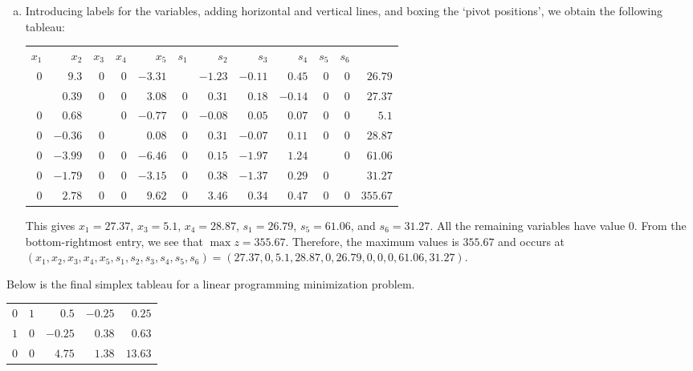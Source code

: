 \documentclass[11pt,letterpaper]{article}
\begin{document}
\begin{enumerate}[(a)]
\item Introducing labels for the variables, adding horizontal and vertical lines, and boxing the `pivot positions', we obtain the following tableau: \par
	\begin{table}[H]
	\centering
	\begin{tabular}{rrrrrrrrrrrr}
	{\footnotesize $x_1$} & {\footnotesize $x_2$} & {\footnotesize $x_3$} & {\footnotesize $x_4$} & {\footnotesize $x_5$} & {\footnotesize $s_1$} & {\footnotesize $s_2$} & {\footnotesize $s_3$} & {\footnotesize $s_4$} & {\footnotesize $s_5$} & {\footnotesize $s_6$} & \\ 	
	$0$ & $9.3$ & $0$ & $0$ & $-3.31$ & \boxed{$1$} & $-1.23$ & $-0.11$ & $0.45$ & $0$ & \multicolumn{1}{r|}{$0$} & $26.79$ \\
	\boxed{$1$} & $0.39$ & $0$ & $0$ & $3.08$ & $0$ & $0.31$ & $0.18$ & $-0.14$ & $0$ & \multicolumn{1}{r|}{$0$} & $27.37$ \\
	$0$ & $0.68$ & \boxed{$1$} & $0$ & $-0.77$ & $0$ & $-0.08$ & $0.05$ & $0.07$ & $0$ & \multicolumn{1}{r|}{$0$} & $5.1$ \\
	$0$ & $-0.36$ & $0$ & \boxed{$1$} & $0.08$ & $0$ & $0.31$ & $-0.07$ & $0.11$ & $0$ & \multicolumn{1}{r|}{$0$} & $28.87$ \\
	$0$ & $-3.99$ & $0$ & $0$ & $-6.46$ & $0$ & $0.15$ & $-1.97$ & $1.24$ & \boxed{$1$} & \multicolumn{1}{r|}{$0$} & $61.06$ \\
	$0$ & $-1.79$ & $0$ & $0$ & $-3.15$ & $0$ & $0.38$ & $-1.37$ & $0.29$ & $0$ & \multicolumn{1}{r|}{\boxed{$1$}} & $31.27$ \\ \hline
	$0$ & $2.78$ & $0$ & $0$ & $9.62$ & $0$ & $3.46$ & $0.34$ & $0.47$ & $0$ & \multicolumn{1}{r|}{$0$} & $355.67$
	\end{tabular}
	\end{table}
This gives $x_1= 27.37$, $x_3= 5.1$, $x_4= 28.87$, $s_1= 26.79$, $s_5= 61.06$, and $s_6= 31.27$. All the remaining variables have value $0$. From the bottom-rightmost entry, we see that $\max z= 355.67$. Therefore, the maximum values is $355.67$ and occurs at $(x_1, x_2, x_3, x_4, x_5, s_1, s_2, s_3, s_4, s_5, s_6)= (27.37, 0, 5.1, 28.87, 0, 26.79, 0, 0, 0, 61.06, 31.27)$. 
\end{enumerate}



\newpage



 Below is the final simplex tableau for a linear programming minimization problem. \par
	\begin{table}[H]
	\centering
	\begin{tabular}{rrrrr}
	$0$ & $1$ & $0.5$ & $-0.25$ & $0.25$ \\
	$1$ & $0$ & $-0.25$ & $0.38$ & $0.63$ \\
	$0$ & $0$ & $4.75$ & $1.38$ & $13.63$
	\end{tabular}
	\end{table}
\end{document}
